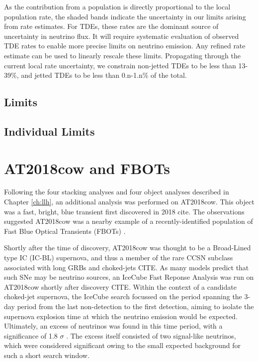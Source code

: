 As the contribution from a population is directly proportional to the local population rate, the shaded bands indicate the uncertainty in our limits arising from rate estimates. For TDEs, these rates are the dominant source of uncertainty in neutrino flux. It will require systematic evaluation of observed TDE rates to enable more precise limits on neutrino emission. Any refined rate estimate can be used to linearly rescale these limits. Propagating through the current local rate uncertainty, we constrain non-jetted TDEs to be less than 13-39\%, and jetted TDEs to be less than 0.n-1.n\% of the total.

\subsection{Limits}

\subsection{Individual Limits}



\section{AT2018cow and FBOTs}

Following the four stacking analyses and four object analyses described in Chapter \ref{ch:llh}, an additional analysis was performed on AT2018cow. This object
was a fast, bright, blue transient first discovered in 2018 cite. The observations suggested AT2018cow was a nearby example of a recently-identified population of Fast Blue Optical Transients (FBOTs) . 

Shortly after the time of discovery, AT2018cow was thought to be a Broad-Lined type IC (IC-BL) supernova, and thus a member of the rare CCSN subclass associated with long GRBs and choked-jets CITE. As many models predict that such SNe may be neutrino sources, an IceCube Fast Reponse Analysis was run on AT2018cow shortly after discovery CITE. Within the context of a candidate choked-jet supernova, the IceCube search focussed on the period spanning the 3-day period from the last non-detection to the first detection, aiming to isolate the supernova explosion time at which the neutrino emission would be expected. Ultimately, an excess of neutrinos was found in this time period, with a significance of 1.8 $\sigma$ . The excess itself consisted of two signal-like neutrinos, which were considered significant owing to the small expected background for such a short search window.

